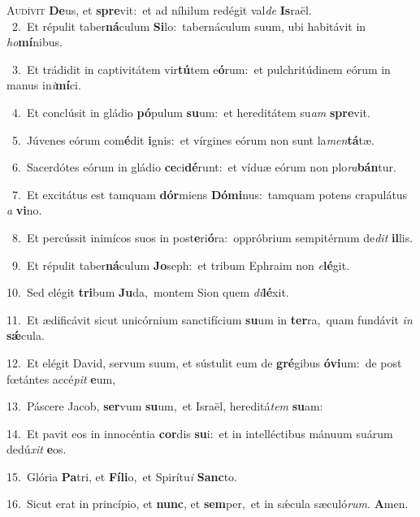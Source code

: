 \lettrine{\initial\textcolor{\initialcolor}{A}}{udívit} \textbf{De}\-us, et \textbf{spre}\-vit:~\star et ad níhilum redégit val\textit{de} \textbf{Is}\-raël.\\
{\numbfont\textcolor{\numbcolor}{~2.}}~Et répulit taber\-\textbf{ná}\-culum \textbf{Si}\-lo:~\star tabernáculum suum, ubi habitávit in \textit{ho}\-\textbf{mí}nibus.\par
{\numbfont\textcolor{\numbcolor}{~3.}}~Et trádidit in captivitátem vir\-\textbf{tú}\-tem e\-\textbf{ó}\-rum:~\star et pulchritúdinem eórum in manus in\-\textit{i}\-\textbf{mí}ci.\par
{\numbfont\textcolor{\numbcolor}{~4.}}~Et conclúsit in gládio \textbf{pó}\-pulum \textbf{su}\-um:~\star et hereditátem su\textit{am} \textbf{spre}\-vit.\par
{\numbfont\textcolor{\numbcolor}{~5.}}~Júvenes eórum com\-\textbf{é}\-dit \textbf{i}\-gnis:~\star et vírgines eórum non sunt la\-\textit{men}\-\textbf{tá}tæ.\par
{\numbfont\textcolor{\numbcolor}{~6.}}~Sacerdótes eórum in gládio \textbf{ce}\-ci\-\textbf{dé}\-runt:~\star et víduæ eórum non plo\-\textit{ra}\-\textbf{bán}tur.\par
{\numbfont\textcolor{\numbcolor}{~7.}}~Et excitátus est tamquam \textbf{dór}\-miens \textbf{Dó}\-\textbf{mi}nus:~\star tamquam potens crapulátus \textit{a} \textbf{vi}\-no.\par
{\numbfont\textcolor{\numbcolor}{~8.}}~Et percússit inimícos suos in post\-\textbf{e}\-ri\-\textbf{ó}\-ra:~\star oppróbrium sempitérnum de\textit{dit} \textbf{il}\-lis.\par
{\numbfont\textcolor{\numbcolor}{~9.}}~Et répulit taber\-\textbf{ná}\-culum \textbf{Jo}\-seph:~\star et tribum Ephraim non \textit{e}\-\textbf{lé}git.\par
{\numbfont\textcolor{\numbcolor}{10.}}~Sed elégit \textbf{tri}\-bum \textbf{Ju}\-da,~\star montem Sion quem \textit{di}\-\textbf{lé}xit.\par
{\numbfont\textcolor{\numbcolor}{11.}}~Et ædificávit sicut unicórnium sanctifícium \textbf{su}\-um in \textbf{ter}\-ra,~\star quam fundávit \textit{in} \textbf{sǽ}\-cula.\par
{\numbfont\textcolor{\numbcolor}{12.}}~Et elégit David, servum suum, et sústulit eum de \textbf{gré}\-gibus \textbf{ó}\-\textbf{vi}um:~\star de post fœtántes accé\textit{pit} \textbf{e}\-um,\par
{\numbfont\textcolor{\numbcolor}{13.}}~Páscere Jacob, \textbf{ser}\-vum \textbf{su}\-um,~\star et Israël, hereditá\textit{tem} \textbf{su}\-am:\par
{\numbfont\textcolor{\numbcolor}{14.}}~Et pavit eos in innocéntia \textbf{cor}\-dis \textbf{su}\-i:~\star et in intelléctibus mánuum suárum dedú\textit{xit} \textbf{e}\-os.\par
{\numbfont\textcolor{\numbcolor}{15.}}~Glória \textbf{Pa}\-tri, et \textbf{Fí}\-\textbf{li}o,~\star et Spirítu\textit{i} \textbf{Sanc}\-to.\par
{\numbfont\textcolor{\numbcolor}{16.}}~Sicut erat in princípio, et \textbf{nunc}\-, et \textbf{sem}\-per,~\star et in sǽcula sæculó\-\textit{rum}\-. \textbf{A}\-men.\par
